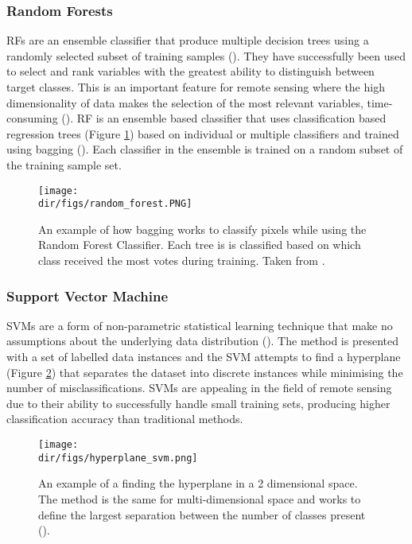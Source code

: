 \subsubsection{Random Forests}
RFs are an ensemble classifier that produce multiple decision trees using a randomly selected subset of training samples (\cite{Breiman01}). They have successfully been used to select and rank variables with the greatest ability to distinguish between target classes. This is an important feature for remote sensing where the high dimensionality of data makes the selection of the most relevant variables, time-consuming (\cite{belgiu16}). RF is an ensemble based classifier that uses classification based regression trees (Figure \ref{fig.random_forest}) based on individual or multiple classifiers and trained using bagging (\cite{belgiu16}). Each classifier in the ensemble is trained on a random subset of the training sample set.

\begin{figure}[htpb]
    \centering
    \texttt{[image: \\dir/figs/random\_forest.PNG]}
    \caption[An example of classifying using Random Forests]{An example of how bagging works to classify pixels while using the Random Forest Classifier. Each tree is is classified based on which class received the most votes during training. Taken from \citet{belgiu16}.}
    \label{fig.random_forest}
\end{figure}
\subsubsection{Support Vector Machine}
SVMs are a form of non-parametric statistical learning technique that make no assumptions about the underlying data distribution (\cite{vapnik82}). The method is presented with a set of labelled data instances and the SVM attempts to find a hyperplane (Figure \ref{fig.svm_hyperplane}) that separates the dataset into discrete instances while minimising the number of misclassifications. SVMs are appealing in the field of remote sensing due to their ability to successfully handle small training sets, producing higher classification accuracy than traditional methods.
\begin{figure}[htpb]
    \centering
    \texttt{[image: \\dir/figs/hyperplane\_svm.png]}
    \caption[An example of finding the hyperplane for Support Vector Machine Learning]{An example of a finding the hyperplane in a 2 dimensional space. The method is the same for multi-dimensional space and works to define the largest separation between the number of classes present (\cite{cortes95}).}
    \label{fig.svm_hyperplane}
\end{figure}
